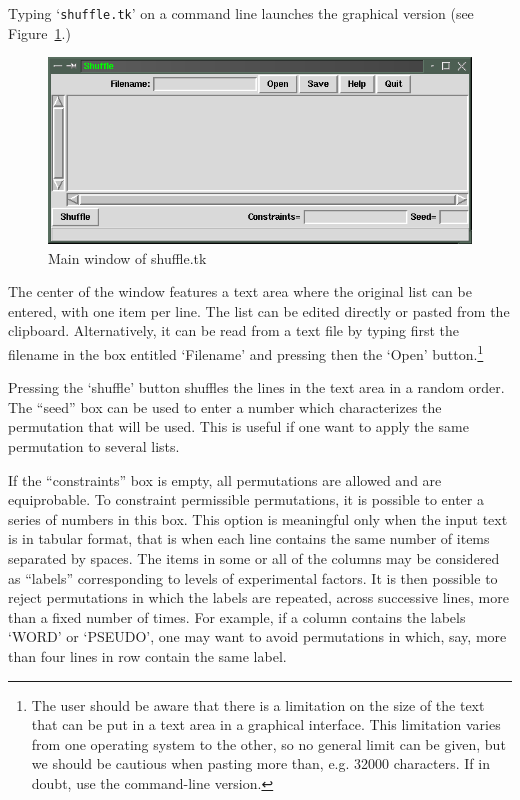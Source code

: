 \documentclass[doc]{apa}
\begin{document}
Typing `\texttt{shuffle.tk}' on a command line launches the graphical version
(see Figure~\ref{tk}.)

\begin{figure}[h]
\begin{center}
\includegraphics[width=12cm]{shufftk}
\end{center}
\caption{Main window of shuffle.tk}\label{tk}
\end{figure}

The center of the window features a text area where the original list can be
entered, with one item per line. The list can be edited directly or pasted
from the clipboard. Alternatively, it can be read from a text file by typing
first the filename in the box entitled `Filename' and pressing then the `Open'
button.\footnote{The user should be aware that there is a limitation on the
  size of the text that can be put in a text area in a graphical interface.
  This limitation varies from one operating system to the other, so no general
  limit can be given, but we should be cautious when pasting more than, e.g.
  32000 characters. If in doubt, use the command-line version.}

Pressing the `shuffle' button shuffles the lines in the text area in a random
order. The ``seed'' box can be used to enter a number which characterizes the
permutation that will be used. This is useful if one want to apply the same
permutation to several lists.

If the ``constraints'' box is empty, all permutations are allowed and are
equiprobable. To constraint permissible permutations, it is possible to enter
a series of numbers in this box.  This option is meaningful only when the
input text is in tabular format, that is when each line contains the same
number of items separated by spaces. The items in some or all of the columns
may be considered as ``labels'' corresponding to levels of experimental
factors. It is then possible to reject permutations in which the labels are
repeated, across successive lines, more than a fixed number of times. For
example, if a column contains the labels `WORD' or `PSEUDO', one may want to
avoid permutations in which, say, more than four lines in row contain the same
label.
\end{document}

